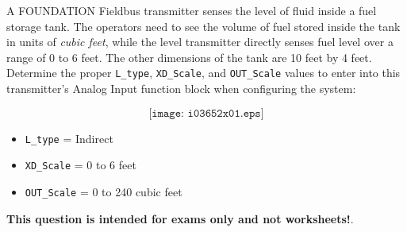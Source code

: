 

A FOUNDATION Fieldbus transmitter senses the level of fluid inside a fuel storage tank.  The operators need to see the volume of fuel stored inside the tank in units of {\it cubic feet}, while the level transmitter directly senses fuel level over a range of 0 to 6 feet.  The other dimensions of the tank are 10 feet by 4 feet.  Determine the proper {\tt L\_type}, {\tt XD\_Scale}, and {\tt OUT\_Scale} values to enter into this transmitter's Analog Input function block when configuring the system:

$$\texttt{[image: i03652x01.eps]}$$







\begin{itemize}
\item{} {\tt L\_type} = Indirect
\item{} {\tt XD\_Scale} = 0 to 6 feet
\item{} {\tt OUT\_Scale} = 0 to 240 cubic feet
\end{itemize}







{\bf This question is intended for exams only and not worksheets!}.



